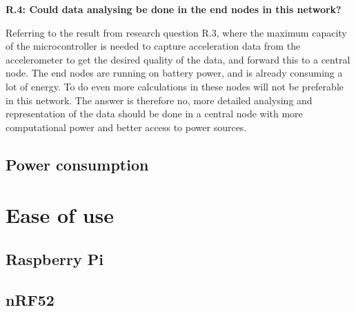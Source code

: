 \noindent\textbf{R.4: Could data analysing be done in the end nodes in this network?}

Referring to the result from research question R.3, where the maximum capacity of the \gls{microcontroller} is needed to capture acceleration data from the accelerometer to get the desired quality of the data, and forward this to a central node. The end nodes are running on battery power, and is already consuming a lot of energy. To do even more calculations in these nodes will not be preferable in this network. The answer is therefore no, more detailed analysing and representation of the data should be done in a central node with more computational power and better access to power sources. 




\subsection{Power consumption}



\section{Ease of use}


\subsection{Raspberry Pi}



\subsection{nRF52}





